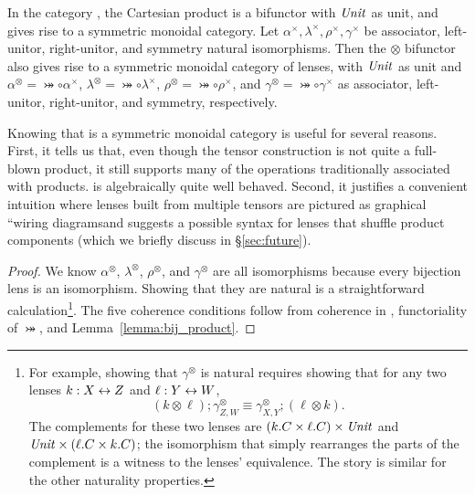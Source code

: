 \begin{defn}[$R$-similarity]
\begin{theorem}
\begin{lemma}
\begin{theorem}[No products]
\begin{prop}
In the category \SET, the Cartesian product is a bifunctor with $\mathit{Unit}$ as
unit, and gives rise to a symmetric monoidal category. Let
$\alpha^\times,\lambda^\times,\rho^\times,\gamma^\times$ be associator,
left-unitor, right-unitor, and symmetry natural isomorphisms. Then the
$\otimes$ bifunctor also gives rise to a symmetric monoidal category of
lenses, with $\mathit{Unit}$ as unit and $\alpha^\otimes=\bij\circ\alpha^\times$,
$\lambda^\otimes=\bij\circ\lambda^\times$,
$\rho^\otimes=\bij\circ\rho^\times$, and
$\gamma^\otimes=\bij\circ\gamma^\times$ as associator, left-unitor,
right-unitor, and symmetry, respectively.
\end{prop}

Knowing that \LENS{} is a symmetric monoidal category is useful for several
reasons.  First, it tells us that, even though the tensor construction is not quite a full-blown
product, it \iffull still supports many of the operations
traditionally associated with products. \else is algebraically quite well
behaved. \fi
Second, it justifies a convenient intuition where lenses built from multiple
tensors are pictured as graphical ``wiring diagrams\commaquote and suggests a
possible syntax for lenses that shuffle product components (which we briefly
discuss in \S\ref{sec:future}).

\iflater{}\fi

\iffull
\begin{proof}
We know $\alpha^\otimes$, $\lambda^\otimes$, $\rho^\otimes$, and
$\gamma^\otimes$ are all isomorphisms because every bijection lens is an
isomorphism. Showing that they are natural is a straightforward
calculation\footnote{For example, showing that $\gamma^\otimes$ is natural
requires showing that for any two lenses $k : X \leftrightarrow Z$ and $\ell : Y \leftrightarrow
W$,
\[(k \otimes \ell);\gamma^\otimes_{Z,W} \equiv \gamma^\otimes_{X,Y};(\ell
\otimes k).\]
The complements for these two lenses are $(k.C \times \ell.C) \times \mathit{Unit}$
and $\mathit{Unit} \times (\ell.C \times k.C)$; the isomorphism that simply
rearranges the parts of the complement is a witness to the lenses'
equivalence.  The story is similar for the other naturality properties.}.
The five coherence conditions follow from coherence in \SET, functoriality of
$\bij$, and Lemma~\ref{lemma:bij_product}.
\end{proof}
\fi


\end{theorem}
\end{lemma}
\end{theorem}
\end{defn}
